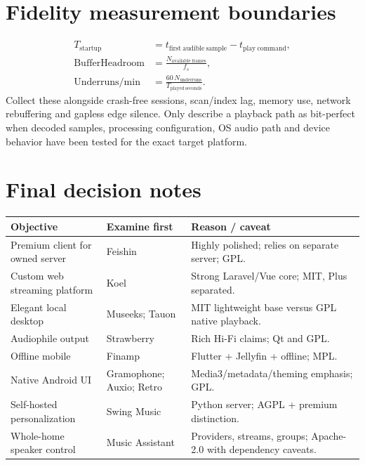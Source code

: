 \documentclass[10pt,a4paper,oneside]{report}
\begin{document}
\section*{Fidelity measurement boundaries}
\begin{align*}
T_{\mathrm{startup}} &= t_{\mathrm{first\ audible\ sample}}-t_{\mathrm{play\ command}},\\
\mathrm{BufferHeadroom} &= \frac{N_{\mathrm{available\ frames}}}{f_s},\\
\mathrm{Underruns/min} &= \frac{60\,N_{\mathrm{underruns}}}{T_{\mathrm{played\ seconds}}}.
\end{align*}
Collect these alongside crash-free sessions, scan/index lag, memory use, network rebuffering and gapless edge silence. Only describe a playback path as bit-perfect when decoded samples, processing configuration, OS audio path and device behavior have been tested for the exact target platform.

\section*{Final decision notes}
\begin{longtable}{@{}p{33mm}p{47mm}p{58mm}@{}}\toprule
Objective & Examine first & Reason / caveat\\\midrule\endhead
Premium client for owned server & Feishin & Highly polished; relies on separate server; GPL.\\
Custom web streaming platform & Koel & Strong Laravel/Vue core; MIT, Plus separated.\\
Elegant local desktop & Museeks; Tauon & MIT lightweight base versus GPL native playback.\\
Audiophile output & Strawberry & Rich Hi-Fi claims; Qt and GPL.\\
Offline mobile & Finamp & Flutter + Jellyfin + offline; MPL.\\
Native Android UI & Gramophone; Auxio; Retro & Media3/metadata/theming emphasis; GPL.\\
Self-hosted personalization & Swing Music & Python server; AGPL + premium distinction.\\
Whole-home speaker control & Music Assistant & Providers, streams, groups; Apache-2.0 with dependency caveats.\\
\bottomrule\end{longtable}
\end{document}
